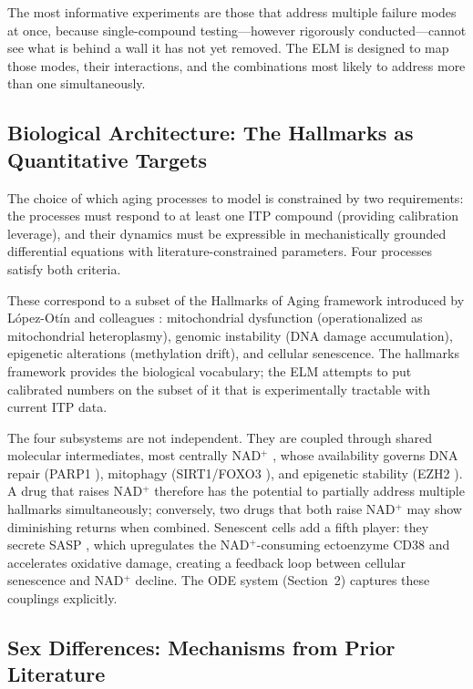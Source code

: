 \documentclass[11pt]{article}
\begin{document}
The most informative experiments are those that address multiple failure modes at once, because single-compound testing---however rigorously conducted---cannot see what is behind a wall it has not yet removed. The ELM is designed to map those modes, their interactions, and the combinations most likely to address more than one simultaneously.

\subsection{Biological Architecture: The Hallmarks as Quantitative Targets}

The choice of which aging processes to model is constrained by two requirements: the processes must respond to at least one ITP compound (providing calibration leverage), and their dynamics must be expressible in mechanistically grounded differential equations with literature-constrained parameters. Four processes satisfy both criteria.

These correspond to a subset of the Hallmarks of Aging framework introduced by L\'opez-Ot\'in and colleagues \citep{LopezOtin2013,LopezOtin2023}: mitochondrial dysfunction (operationalized as mitochondrial heteroplasmy), genomic instability (DNA damage accumulation), epigenetic alterations (methylation drift), and cellular senescence. The hallmarks framework provides the biological vocabulary; the ELM attempts to put calibrated numbers on the subset of it that is experimentally tractable with current ITP data.

The four subsystems are not independent. They are coupled through shared molecular intermediates, most centrally NAD$^+$ \citep{Yoshino2011,CamachoPereira2016}, whose availability governs DNA repair (PARP1 \citep{Bai2011}), mitophagy (SIRT1/FOXO3 \citep{Imai2014,Warr2013}), and epigenetic stability (EZH2 \citep{Vire2006}). A drug that raises NAD$^+$ therefore has the potential to partially address multiple hallmarks simultaneously; conversely, two drugs that both raise NAD$^+$ may show diminishing returns when combined. Senescent cells add a fifth player: they secrete SASP \citep{Coppe2008}, which upregulates the NAD$^+$-consuming ectoenzyme CD38 \citep{Tarrago2018} and accelerates oxidative damage, creating a feedback loop between cellular senescence and NAD$^+$ decline. The ODE system (Section~2) captures these couplings explicitly.

\subsection{Sex Differences: Mechanisms from Prior Literature}
\end{document}
